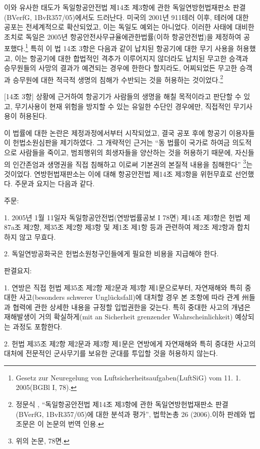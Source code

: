 이와 유사한 태도가 독일항공안전법 제14조 제3항에 관한 독일연방헌법재판소 판결(BVerfG, 1BvR357/05)에서도 드러난다. 미국의 2001년 911테러 이후, 테러에 대한 공포는 전세계적으로 확산되었고, 이는 독일도 예외는 아니었다. 이러한 사태에 대비한 조치로 독일은 2005년 항공안전사무규율에관한법률(이하 항공안전법)을 제정하여 공포했다.\footnote{Gesetz zur Neuregelung von Luftsicherheitsaufgaben(LuftSiG) vom 11. 1. 2005(BGBl I, 78).} 특히 이 법 14조 3항은 다음과 같이 납치된 항공기에 대한 무기 사용을 허용했고, 이는 항공기에 대한 합법적인 격추가 이루어지지 않더라도 납치된 무고한 승객과 승무원들의 사망의 결과가 예견되는 경우에 한한다 할지라도, 어찌되었든 무고한 승객과 승무원에 대한 적극적 생명의 침해가 수반되는 것을 허용하는 것이었다.\footnote{정문식 , ``독일항공안전법 제14조 제3항에 관한 독일연방헌법재판소 판결(BVerfG, 1BvR357/05)에 대한 분석과 평가'', 법학논총 26 (2006).이하 판례와 법조문은 이 논문의 번역 인용.}

{[}14조 3항{]} 상황에 근거하여 항공기가 사람들의 생명을 해칠 목적이라고 판단할 수 있고, 무기사용이 현재 위험을 방지할 수 있는 유일한 수단인 경우에만, 직접적인 무기사용이 허용된다.

이 법률에 대한 논란은 제정과정에서부터 시작되었고, 결국 공포 후에 항공기 이용자들이 헌법소원심판을 제기하였다. 그 개략적인 근거는 ``동 법률이 국가로 하여금 의도적으로 사람들을 죽이고, 범죄행위의 희생자들을 양산하는 것을 허용하기 때문에, 자신들의 인간존엄과 생명권을 직접 침해하고 이로써 기본권의 본질적 내용을 침해한다'' \footnote{위의 논문, 78면.}는 것이었다. 연방헌법재판소는 이에 대해 항공안전법 제14조 제3항을 위헌무효로 선언했다. 주문과 요지는 다음과 같다.

주문:

1. 2005년 1월 11일자 독일항공안전법(연방법률공보 I 78면) 제14조 제3항은 헌법 제87a조 제2항, 제35조 제2항 제3항 및 제1조 제1항 등과 관련하여 제2조 제2항과 합치하지 않고 무효다.

2. 독일연방공화국은 헌법소원청구인들에게 필요한 비용을 지급해야 한다.

판결요지:

1. 연방은 직접 헌법 제35조 제2항 제2문과 제3항 제1문으로부터, 자연재해와 특히 중대한 사고(besonders schwerer Unglücksfall)에 대처할 경우 본 조항에 따라 관계 州들과 협력에 관한 상세한 내용을 규정할 입법권한을 갖는다. 특히 중대한 사고의 개념은 재해발생이 거의 확실하게(mit an Sicherheit grenzender Wahrscheinlichkeit) 예상되는 과정도 포함한다.

2. 헌법 제35조 제2항 제2문과 제3항 제1문은 연방에게 자연재해와 특히 중대한 사고의 대처에 전문적인 군사무기를 보유한 군대를 투입할 것을 허용하지 않는다.

